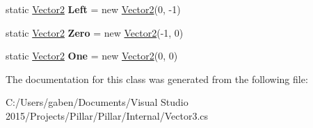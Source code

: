 \begin{DoxyCompactItemize}
static \hyperlink{class_pillar3_d_1_1_vector2}{Vector2} {\bfseries Left} = new \hyperlink{class_pillar3_d_1_1_vector2}{Vector2}(0, -\/1)
\item 
\mbox{\label{class_pillar3_d_1_1_vector2_a164e9bd5f029fc312580abccf66a6991}} 
static \hyperlink{class_pillar3_d_1_1_vector2}{Vector2} {\bfseries Zero} = new \hyperlink{class_pillar3_d_1_1_vector2}{Vector2}(-\/1, 0)
\item 
\mbox{\label{class_pillar3_d_1_1_vector2_a68f7311610015bc1036fd34bafcc0a18}} 
static \hyperlink{class_pillar3_d_1_1_vector2}{Vector2} {\bfseries One} = new \hyperlink{class_pillar3_d_1_1_vector2}{Vector2}(0, 0)
\end{DoxyCompactItemize}


The documentation for this class was generated from the following file\+:\begin{DoxyCompactItemize}
\item 
C\+:/\+Users/gaben/\+Documents/\+Visual Studio 2015/\+Projects/\+Pillar/\+Pillar/\+Internal/Vector3.\+cs\end{DoxyCompactItemize}
